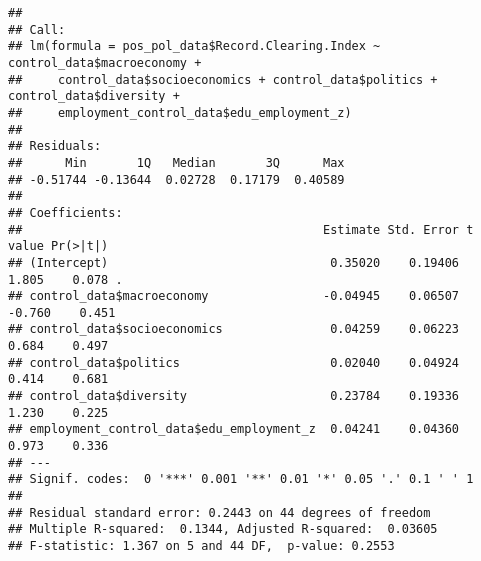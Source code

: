\documentclass[
]{article}
\newenvironment{Shaded}{\begin{snugshade}}{\end{snugshade}}
\newcommand{\CommentTok}[1]{\textcolor[rgb]{0.56,0.35,0.01}{\textit{#1}}}
\newcommand{\FunctionTok}[1]{\textcolor[rgb]{0.13,0.29,0.53}{\textbf{#1}}}
\newcommand{\NormalTok}[1]{#1}
\newcommand{\OtherTok}[1]{\textcolor[rgb]{0.56,0.35,0.01}{#1}}
\newcommand{\SpecialCharTok}[1]{\textcolor[rgb]{0.81,0.36,0.00}{\textbf{#1}}}
\begin{document}
\begin{Shaded}
\end{Shaded}

\begin{verbatim}
## 
## Call:
## lm(formula = pos_pol_data$Record.Clearing.Index ~ control_data$macroeconomy + 
##     control_data$socioeconomics + control_data$politics + control_data$diversity + 
##     employment_control_data$edu_employment_z)
## 
## Residuals:
##      Min       1Q   Median       3Q      Max 
## -0.51744 -0.13644  0.02728  0.17179  0.40589 
## 
## Coefficients:
##                                          Estimate Std. Error t value Pr(>|t|)  
## (Intercept)                               0.35020    0.19406   1.805    0.078 .
## control_data$macroeconomy                -0.04945    0.06507  -0.760    0.451  
## control_data$socioeconomics               0.04259    0.06223   0.684    0.497  
## control_data$politics                     0.02040    0.04924   0.414    0.681  
## control_data$diversity                    0.23784    0.19336   1.230    0.225  
## employment_control_data$edu_employment_z  0.04241    0.04360   0.973    0.336  
## ---
## Signif. codes:  0 '***' 0.001 '**' 0.01 '*' 0.05 '.' 0.1 ' ' 1
## 
## Residual standard error: 0.2443 on 44 degrees of freedom
## Multiple R-squared:  0.1344, Adjusted R-squared:  0.03605 
## F-statistic: 1.367 on 5 and 44 DF,  p-value: 0.2553
\end{verbatim}
\end{document}
